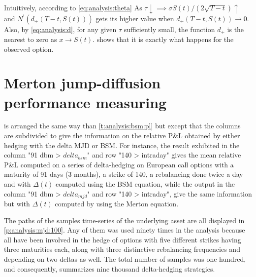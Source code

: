 \documentclass[12pt]{report}
\begin{document}
Intuitively, according to \cref{eq:analysis:theta} As $\tau \downarrow \implies \sigma S(t) / (2\sqrt{T-t}) \uparrow$ and $N^{'}(d_{+}(T-t, S(t)))$ gets its higher value when $d_{+}(T-t, S(t)) \to 0$.
Also, by \cref{eq:analysis:d}, for any given $\tau$ sufficiently small, the function $d_{+}$ is the nearest to zero as $x \to S(t)$.
 shows that it is exactly what happens for the observed option.




    
    
    
    
    
    
    
    
    
    
    
    
    
    
    
    







\section{Merton jump-diffusion performance measuring}
\label{sec:section name}

 is arranged the same way than \cref{t:analysis:bsm:pl} but except that the columns are subdivided to give the information on the relative P\&L obtained by either hedging with the delta MJD or BSM.
For instance, the result exhibited in the column "91 dbm > $delta_{bsm}$" and row "140 > intraday" gives the mean relative P\&L computed on a series of delta-hedging on European call options with a maturity of 91 days (3 months), a strike of 140, a rebalancing done twice a day and with $\Delta(t)$ computed using the BSM equation, while the output in the column "91 dbm > $delta_{mjd}$" and row "140 > intraday", give the same information but with $\Delta(t)$ computed by using the Merton equation.

The paths of the samples time-series of the underlying asset are all displayed in \cref{p:analysis:mjd:100}. 
Any of them was used ninety times in the analysis because all have been involved in the hedge of options with five different strikes having three maturities each, along with three distinctive rebalancing frequencies and depending on two deltas as well.
The total number of samples was one hundred, and consequently,  summarizes nine thousand delta-hedging strategies.
\end{document}
